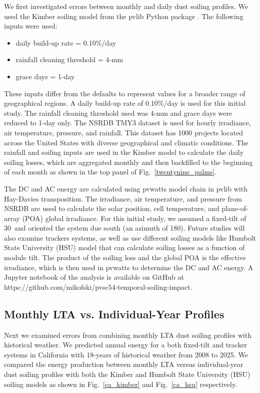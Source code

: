 \documentclass[conference]{IEEEtran}
\begin{document}
We first investigated errors between monthly and daily dust soiling profiles. We used the Kimber soiling model \cite{kimber} from the pvlib Python package \cite{holmgren2018joss}. The following inputs were used:
\begin{itemize}
\item daily build-up rate = 0.10\%/day
\item rainfall cleaning threshold = 4-mm
\item grace days = 1-day
\end{itemize}
These inputs differ from the defaults to represent values for a broader range of geographical regions. A daily build-up rate of 0.10\%/day is used for this initial study. The rainfall cleaning threshold used was 4-mm and grace days were reduced to 1-day only. The NSRDB TMY3 dataset is used for hourly irradiance, air temperature, pressure, and rainfall. This dataset has 1000 projects located across the United States with diverse geographical and climatic conditions. The rainfall and soiling inputs are used in the Kimber model to calculate the daily soiling losses, which are aggregated monthly and then backfilled to the beginning of each month as shown in the top panel of Fig.~\ref{twentynine_palms}.

The DC and AC energy are calculated using pvwatts model chain in pvlib with Hay-Davies transposition. The irradiance, air temperature, and pressure from NSRDB are used to calculate the solar position, cell temperature, and plane-of-array (POA) global irradiance. For this initial study, we assumed a fixed-tilt of 30\textdegree\ and oriented the system due south (an azimuth of 180\textdegree). Future studies will also examine trackers systems, as well as use different soiling models like Humbolt State University (HSU) model \cite{hsu} that can calculate soiling losses as a function of module tilt. The product of the soiling loss and the global POA is the effective irradiance, which is then used in pvwatts to determine the DC and AC energy. A Jupyter notebook of the analysis is available on GitHub at https://github.com/mikofski/pvsc54-temporal-soiling-impact.

\subsection{Monthly LTA vs. Individual-Year Profiles}

Next we examined errors from combining monthly LTA dust soiling profiles with historical weather. We predicted annual energy for a both fixed-tilt and tracker systems in California with 18-years of historical weather from 2008 to 2025. We compared the energy production between monthly LTA versus individual-year dust soiling profiles with both the Kimber and Humbolt State University (HSU) soiling models as shown in Fig.~\ref{ca_kimber} and Fig.~\ref{ca_hsu} respectively.
\end{document}
